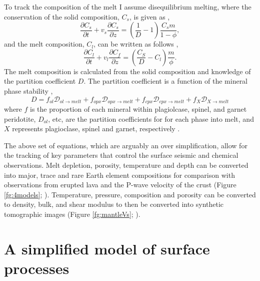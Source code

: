 \begin{subappendices}
To track the composition of the melt I assume disequilibrium melting, where the conservation of the solid composition, $C_{s}$, is given as \citep{spiegelman-1996},
\begin{equation}
\frac{\partial C_{s}}{\partial t} + v_{s}\frac{\partial C_{s}}{\partial z} = \left(\frac{1}{D} - 1\right) \frac{C_{s}m}{1-\phi},
\label{eq:solid-composition}
\end{equation}
and the melt composition, $C_{l}$, can be written as follows \citep{spiegelman-1996},
\begin{equation}
\frac{\partial C_{l}}{\partial t} + v_{l}\frac{\partial C_{f}}{\partial z} = \left(\frac{C_{S}}{D} - C_{l}\right)\frac{m}{\phi}.
\label{eq:melt-composition}
\end{equation}
The melt composition is calculated from the solid composition and knowledge of the partition coefficient $D$. The partition coefficient is a function of the mineral phase stability \citep{mckenzie-1991},
\begin{equation}
D = f_{ol}\mathcal{D}_{ol\rightarrow melt} + f_{opx}\mathcal{D}_{opx\rightarrow melt} + f_{cpx}\mathcal{D}_{cpx\rightarrow melt} + f_{X}\mathcal{D}_{X\rightarrow melt}
\label{eq:onions}
\end{equation}
where $f$ is the proportion of each mineral within plagiolcase, spinel, and garnet peridotite, $D_{ol}$, etc, are the partition coefficients for for each phase into melt, and $X$ represents plagioclase, spinel and garnet, respectively \citep[e.g.][]{armitage-etal-g3-2011,armitage-etal-g3-2018}.

The above set of equations, which are arguably an over simplification, allow for the tracking of key parameters that control the surface seismic and chemical observations. Melt depletion, porosity, temperature and depth can be converted into major, trace and rare Earth element compositions for comparison with observations from erupted lava and the P-wave velocity of the crust (Figure \ref{fg:4models}; \citealp{armitage-etal-2008,armitage-etal-2009,armitage-etal-2010,armitage-etal-g3-2011,armitage-etal-epsl-2015,armitage-etal-g3-2018,armitage-etal-grl-2019}). Temperature, pressure, composition and porosity can be converted to density, bulk, and shear modulus to then be converted into synthetic tomographic images (Figure \ref{fg:mantleVs}; \citealp{goes-etal-2012,armitage-etal-epsl-2015,armitage-etal-g3-2018,armitage-etal-grl-2019}).

\section{A simplified model of surface processes}\label{app2}


\end{subappendices}
